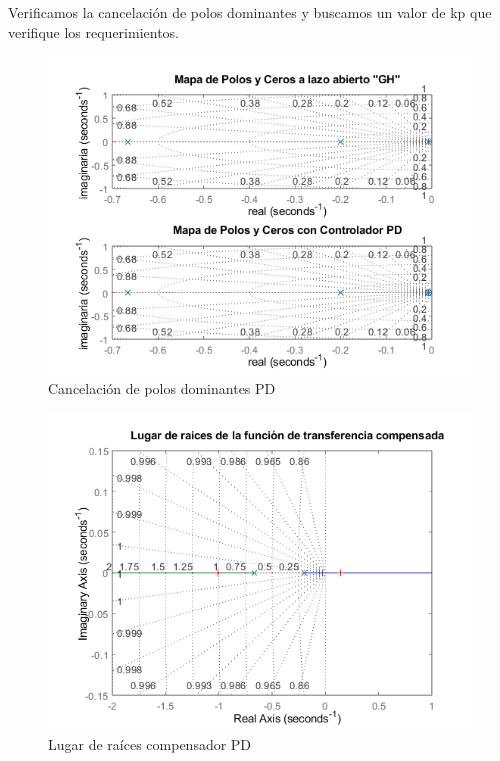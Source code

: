 \documentclass[12pt]{article}
\begin{document}
	Verificamos la cancelación de polos dominantes y buscamos un valor de kp que verifique los requerimientos.
	\begin{figure}[h!]
		\centering
		\includegraphics[width=1\linewidth]{Imagenes/Pzmap_PD}
		\caption[Cancelación de polos dominantes PD]{Cancelación de polos dominantes PD}
		\label{fig:pzmappd}
	\end{figure}\newpage
	
	\begin{figure}
		\centering
		\includegraphics[width=1\linewidth]{Imagenes/Rlocus_comp_PD}
		\caption[Lugar de raíces compensador PD]{Lugar de raíces compensador PD}
		\label{fig:rlocuscomppd}
	\end{figure}
	
\end{document}
